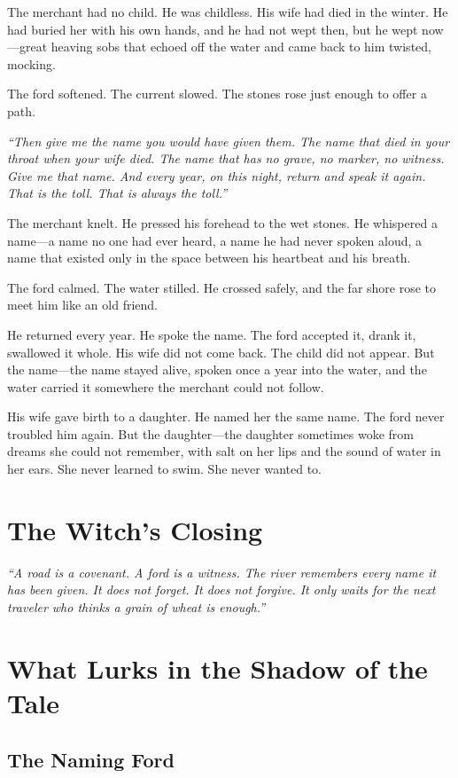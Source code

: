 The merchant had no child. He was childless. His wife had died in the winter. He had buried her with his own hands, and he had not wept then, but he wept now---great heaving sobs that echoed off the water and came back to him twisted, mocking.

The ford softened. The current slowed. The stones rose just enough to offer a path.

\textit{``Then give me the name you would have given them. The name that died in your throat when your wife died. The name that has no grave, no marker, no witness. Give me that name. And every year, on this night, return and speak it again. That is the toll. That is always the toll.''}

The merchant knelt. He pressed his forehead to the wet stones. He whispered a name---a name no one had ever heard, a name he had never spoken aloud, a name that existed only in the space between his heartbeat and his breath.

The ford calmed. The water stilled. He crossed safely, and the far shore rose to meet him like an old friend.

He returned every year. He spoke the name. The ford accepted it, drank it, swallowed it whole. His wife did not come back. The child did not appear. But the name---the name stayed alive, spoken once a year into the water, and the water carried it somewhere the merchant could not follow.

His wife gave birth to a daughter. He named her the same name. The ford never troubled him again. But the daughter---the daughter sometimes woke from dreams she could not remember, with salt on her lips and the sound of water in her ears. She never learned to swim. She never wanted to.

\section*{The Witch's Closing}
\textit{``A road is a covenant. A ford is a witness. The river remembers every name it has been given. It does not forget. It does not forgive. It only waits for the next traveler who thinks a grain of wheat is enough.''}

\section*{What Lurks in the Shadow of the Tale}

\subsection*{The Naming Ford}

